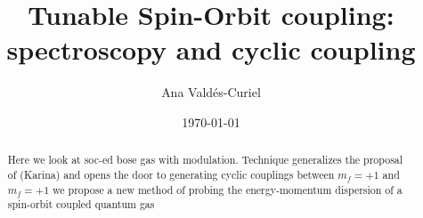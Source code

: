 \documentclass[amsmath,amssymb,floatfix,pra,]{revtex4}
\begin{document}
	
\title{Tunable Spin-Orbit coupling: spectroscopy and cyclic coupling}
	
\author{Ana Vald\'es-Curiel}
\date{\today}

\begin{abstract}
	Here we look at soc-ed bose gas with modulation. Technique generalizes the proposal of (Karina) and opens the door to generating cyclic couplings between $m_f=+1$ and $m_f=+1$ we propose a new method of probing the energy-momentum dispersion of a spin-orbit coupled quantum gas
\end{abstract}

\maketitle


%












 



\end{document}
